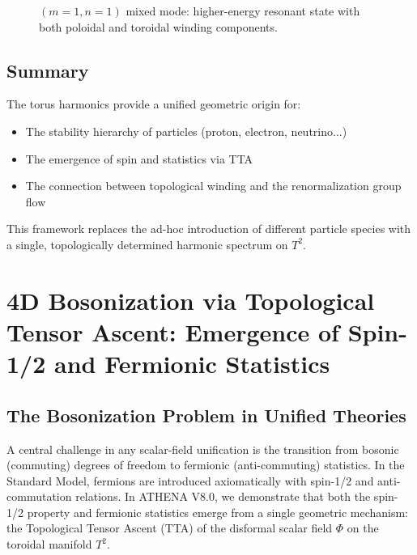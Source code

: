 \documentclass[11pt,a4paper]{article}
\begin{document}
\begin{figure}[H]
\centering
{}
\caption{\((m=1,n=1)\) mixed mode: higher-energy resonant state with both poloidal and toroidal winding components.}
\end{figure}

\subsection{Summary}
The torus harmonics provide a unified geometric origin for:
\begin{itemize}
\item The stability hierarchy of particles (proton, electron, neutrino...)
\item The emergence of spin and statistics via TTA
\item The connection between topological winding and the renormalization group flow
\end{itemize}
This framework replaces the ad-hoc introduction of different particle species with a single, topologically determined harmonic spectrum on \(T^2\).

\section{4D Bosonization via Topological Tensor Ascent: Emergence of Spin-1/2 and Fermionic Statistics}

\subsection{The Bosonization Problem in Unified Theories}
A central challenge in any scalar-field unification is the transition from bosonic (commuting) degrees of freedom to fermionic (anti-commuting) statistics. In the Standard Model, fermions are introduced axiomatically with spin-1/2 and anti-commutation relations. In ATHENA V8.0, we demonstrate that both the spin-1/2 property and fermionic statistics emerge from a single geometric mechanism: the Topological Tensor Ascent (TTA) of the disformal scalar field \(\Phi\) on the toroidal manifold \(T^2\).
\end{document}
